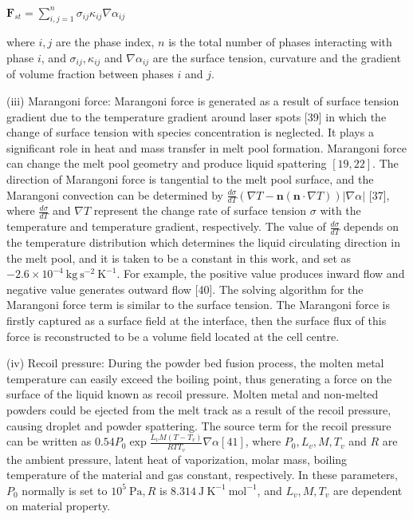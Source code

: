 \documentclass[10pt]{article}
\begin{document}
$\mathbf{F}_{s t}=\sum_{i, j=1}^{n} \sigma_{i j} \kappa_{i j} \nabla \alpha_{i j}$

where $i, j$ are the phase index, $n$ is the total number of phases interacting with phase $i$, and $\sigma_{i j}, \kappa_{i j}$ and $\nabla \alpha_{i j}$ are the surface tension, curvature and the gradient of volume fraction between phases $i$ and $j$.

(iii) Marangoni force: Marangoni force is generated as a result of surface tension gradient due to the temperature gradient around laser spots [39] in which the change of surface tension with species concentration is neglected. It plays a significant role in heat and mass transfer in melt pool formation. Marangoni force can change the melt pool geometry and produce liquid spattering $[19,22]$. The direction of Marangoni force is tangential to the melt pool surface, and the Marangoni convection can be determined by $\frac{d \sigma}{d T}(\nabla T-\mathbf{n}(\mathbf{n} \cdot \nabla T))|\nabla \alpha|$ [37], where $\frac{d \sigma}{d T}$ and $\nabla T$ represent the change rate of surface tension $\sigma$ with the temperature and temperature gradient, respectively. The value of $\frac{d \sigma}{d T}$ depends on the temperature distribution which determines the liquid circulating direction in the melt pool, and it is taken to be a constant in this work, and set as $-2.6 \times 10^{-4} \mathrm{~kg} \mathrm{~s}^{-2} \mathrm{~K}^{-1}$. For example, the positive value produces inward flow and negative value generates outward flow [40]. The solving algorithm for the Marangoni force term is similar to the surface tension. The Marangoni force is firstly captured as a surface field at the interface, then the surface flux of this force is reconstructed to be a volume field located at the cell centre.

(iv) Recoil pressure: During the powder bed fusion process, the molten metal temperature can easily exceed the boiling point, thus generating a force on the surface of the liquid known as recoil pressure. Molten metal and non-melted powders could be ejected from the melt track as a result of the recoil pressure, causing droplet and powder spattering. The source term for the recoil pressure can be written as $0.54 P_{0} \exp \frac{L_{v} M\left(T-T_{v}\right)}{R T T_{v}} \nabla \alpha[41]$, where $P_{0}, L_{v}, M, T_{v}$ and $R$ are the ambient pressure, latent heat of vaporization, molar mass, boiling temperature of the material and gas constant, respectively. In these parameters, $P_{0}$ normally is set to $10^{5} \mathrm{~Pa}, R$ is $8.314 \mathrm{~J} \mathrm{~K}^{-1} \mathrm{~mol}^{-1}$, and $L_{v}, M, T_{v}$ are dependent on material property.
\end{document}
